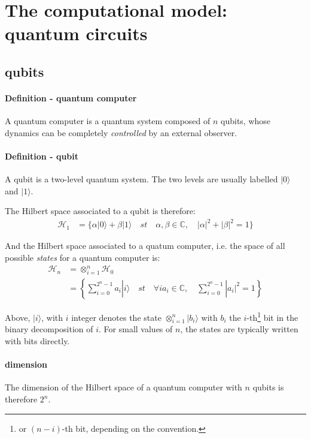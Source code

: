 \documentclass{article}
\begin{document}
\tableofcontents
\section{The computational model: quantum circuits}

\subsection{qubits}

\paragraph{Definition - quantum computer} A quantum computer is a quantum system composed of $n$ qubits,
whose dynamics can be completely \emph{controlled} by an external observer. 

\paragraph{Definition - qubit} A qubit is a two-level quantum system. The two levels are usually labelled
$|0\rangle$ and $|1\rangle$.

The Hilbert space associated to a qubit is therefore: 
\begin{align*}
\mathcal{H}_1 &= \{\alpha |0\rangle + \beta |1\rangle\quad st \quad\alpha,\beta\in\mathbb{C},\quad|\alpha|^{2}+|\beta|^2=1\}
\end{align*}

And the Hilbert space associated to a quatum computer, i.e. the space of all possible \emph{states} for a quantum computer is: 
\begin{align*}
\mathcal{H}_n &=  \otimes_{i=1}^{n} \mathcal{H}_0 \\
              &=  \left\{\sum_{i=0}^{2^n - 1} a_i |i\rangle\quad st\quad\forall i a_i \in \mathbb{C},\quad\sum_{i=0}^{2^n - 1} |a_i|^2 = 1 \right\} 
\end{align*}

Above, $|i\rangle$, with $i$ integer denotes the state $\otimes_{i=1}^{n} |b_i\rangle $ with $b_i$ the $i$-th\footnote{or $(n-i)$-th bit, depending on the
convention.} bit in the binary decomposition of $i$. For small values of $n$, the states are typically written with bits directly.

\paragraph{dimension} The dimension of the Hilbert space of a quantum computer with $n$ qubits is therefore $2^n$.
\end{document}

